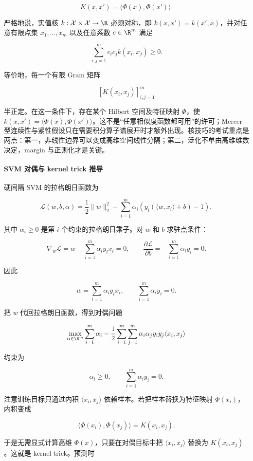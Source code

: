 \[
  K(x,x')=\langle \Phi(x),\Phi(x')\rangle.
\]

严格地说，实值核 \(k:\mathcal{X}\times\mathcal{X}\to\R\) 必须对称，即 \(k(x,x')=k(x',x)\)，并对任意有限点集 \(x_1,\ldots,x_m\) 以及任意系数 \(c\in\R^m\) 满足

\[
  \sum_{i,j=1}^{m}c_i c_j k(x_i,x_j)\ge 0.
\]

等价地，每一个有限 Gram 矩阵

\[
  [K(x_i,x_j)]_{i,j=1}^{m}
\]

半正定。在这一条件下，存在某个 Hilbert 空间及特征映射 \(\Phi\)，使 \(k(x,x')=\langle\Phi(x),\Phi(x')\rangle\)。这不是“任意相似度函数都可用”的许可；Mercer 型连续性与紧性假设只在需要积分算子谱展开时才额外出现。核技巧的考试重点是两点：第一，非线性边界可以变成高维空间线性分隔；第二，泛化不单由高维维数决定，margin 与正则化才是关键。

\paragraph{SVM 对偶与 kernel trick 推导}

硬间隔 SVM 的拉格朗日函数为

\[
  \mathcal{L}(w,b,\alpha)
  =
  \frac12\|w\|_2^2
  -
  \sum_{i=1}^{m}
  \alpha_i
  \left(
    y_i(\langle w,x_i\rangle+b)-1
  \right),
\]

其中 \(\alpha_i\ge0\) 是第 \(i\) 个约束的拉格朗日乘子。对 \(w\) 和 \(b\) 求驻点条件：

\[
  \nabla_w\mathcal{L}
  =
  w-\sum_{i=1}^{m}\alpha_i y_i x_i
  =
  0,
  \qquad
  \frac{\partial\mathcal{L}}{\partial b}
  =
  -\sum_{i=1}^{m}\alpha_i y_i
  =
  0.
\]

因此

\[
  w=\sum_{i=1}^{m}\alpha_i y_i x_i,
  \qquad
  \sum_{i=1}^{m}\alpha_i y_i=0.
\]

把 \(w\) 代回拉格朗日函数，得到对偶问题

\[
  \max_{\alpha\in\R^m}
  \sum_{i=1}^{m}\alpha_i
  -
  \frac12
  \sum_{i=1}^{m}
  \sum_{j=1}^{m}
  \alpha_i\alpha_j y_i y_j
  \langle x_i,x_j\rangle
\]

约束为

\[
  \alpha_i\ge0,
  \qquad
  \sum_{i=1}^{m}\alpha_i y_i=0.
\]

注意训练目标只通过内积 \(\langle x_i,x_j\rangle\) 依赖样本。若把样本替换为特征映射 \(\Phi(x_i)\)，内积变成

\[
  \langle \Phi(x_i),\Phi(x_j)\rangle=K(x_i,x_j).
\]

于是无需显式计算高维 \(\Phi(x)\)，只要在对偶目标中把 \(\langle x_i,x_j\rangle\) 替换为 \(K(x_i,x_j)\)。这就是 kernel trick。预测时

